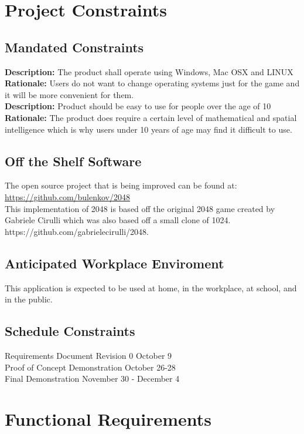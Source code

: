 \documentclass[12pt]{article}
\begin{document}
\section{Project Constraints}
\subsection{Mandated Constraints}
\textbf{Description:} The product shall operate using Windows, Mac OSX and LINUX\\
\textbf{Rationale:} Users do not want to change operating systems just for the game and it will be more convenient for them.\\
\textbf{Description:} Product should be easy to use for people over the age
of 10\\
\textbf{Rationale:} The product does require a certain level of mathematical and spatial intelligence which is why users under 10 years of age may find it difficult to use.
\subsection{Off the Shelf Software}
\par\indent\indent The open source project that is being improved can be found at: \\ \url{https://github.com/bulenkov/2048}\\
This implementation of 2048 is based off the original 2048 game created by Gabriele Cirulli which was also based off a small clone of 1024. https://github.com/gabrielecirulli/2048.
\subsection{Anticipated Workplace Enviroment}
This application is expected to be used at home, in the workplace, at school, and in the public.\\
\subsection{Schedule Constraints}
Requirements Document Revision 0	\hfill	October 9 \\
Proof of Concept Demonstration \hfill		October 26-28 \\
Final Demonstration \hfill				November 30 - December 4 \\

\section{Functional Requirements}
\end{document}
